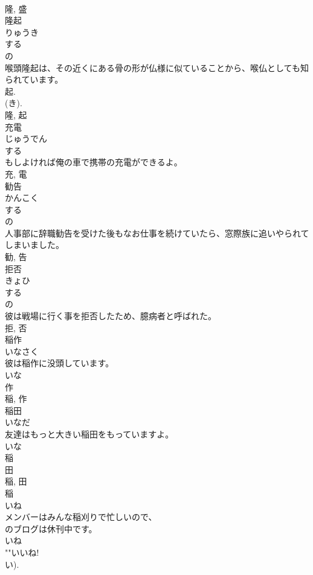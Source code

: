 \documentclass[8pt]{extreport}
\begin{document}
\begin{CJK}{UTF8}{min}
\\	隆, 盛	
\\	隆起	
\\	りゅうき	
\\	する 
\\	の 
\\	喉頭隆起は、その近くにある骨の形が仏様に似ていることから、喉仏としても知られています。	
\\	起. 
\\	(き). 
\\	隆, 起	
\\	充電	
\\	じゅうでん	
\\	する 
\\	もしよければ俺の車で携帯の充電ができるよ。	
\\	充, 電	
\\	勧告	
\\	かんこく	
\\	する 
\\	の 
\\	人事部に辞職勧告を受けた後もなお仕事を続けていたら、窓際族に追いやられてしまいました。	
\\	勧, 告	
\\	拒否	
\\	きょひ	
\\	する 
\\	の 
\\	彼は戦場に行く事を拒否したため、臆病者と呼ばれた。	
\\	拒, 否	
\\	稲作	
\\	いなさく	
\\	彼は稲作に没頭しています。	
\\	いな 
\\	作 
\\	稲, 作	
\\	稲田	
\\	いなだ	
\\	友達はもっと大きい稲田をもっていますよ。	
\\	いな 
\\	稲 
\\	田 
\\	稲, 田	
\\	稲	
\\	いね	
\\	メンバーはみんな稲刈りで忙しいので、
\\	のブログは休刊中です。	
\\	いね 
\\	""いいね!
\\	い).

\end{CJK}
\end{document}
